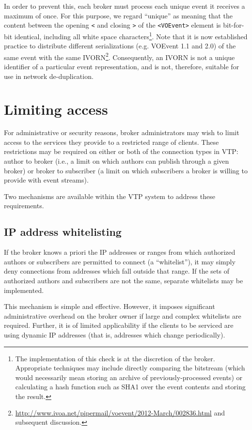 \documentclass[a4paper,11pt]{ivoa}
\begin{document}
In order to prevent this, each broker must process each unique event it
receives a maximum of once. For this purpose, we regard ``unique'' as meaning
that the content between the opening \texttt{<} and closing \texttt{>} of the
\texttt{<VOEvent>} element is bit-for-bit identical, including all white space
characters\footnote{The implementation of this check is at the discretion of
the broker. Appropriate techniques may include directly comparing the
bitstream (which would necessarily mean storing an archive of
previously-processed events) or calculating a hash function such as SHA1
\citep{Eastlake:2001} over the event contents and storing the result.}. Note
that it is now established practice to distribute different serializations
(e.g.  VOEvent 1.1 and 2.0) of the same event with the same
IVORN\footnote{\url{http://www.ivoa.net/pipermail/voevent/2012-March/002836.html}
and subsequent discussion.}.  Consequently, an IVORN is not a unique
identifier of a particular event representation, and is not, therefore,
suitable for use in network de-duplication.

\section{Limiting access}
\label{sec:limit}

For administrative or security reasons, broker administrators may wish to
limit access to the services they provide to a restricted range of clients.
These restrictions may be required on either or both of the connection types
in VTP: author to broker (i.e., a limit on which authors can publish through a
given broker) or broker to subscriber (a limit on which subscribers a broker
is willing to provide with event streams).

Two mechanisms are available within the VTP system to address these
requirements.

\subsection{IP address whitelisting}
\label{sec:limit:whitelist}

If the broker knows a priori the IP addresses or ranges from which authorized
authors or subscribers are permitted to connect (a ``whitelist''), it may
simply deny connections from addresses which fall outside that range. If the
sets of authorized authors and subscribers are not the same, separate
whitelists may be implemented.

This mechanism is simple and effective. However, it imposes significant
administrative overhead on the broker owner if large and complex whitelists
are required. Further, it is of limited applicability if the clients to be
serviced are using dynamic IP addresses (that is, addresses which change
periodically).
\end{document}
